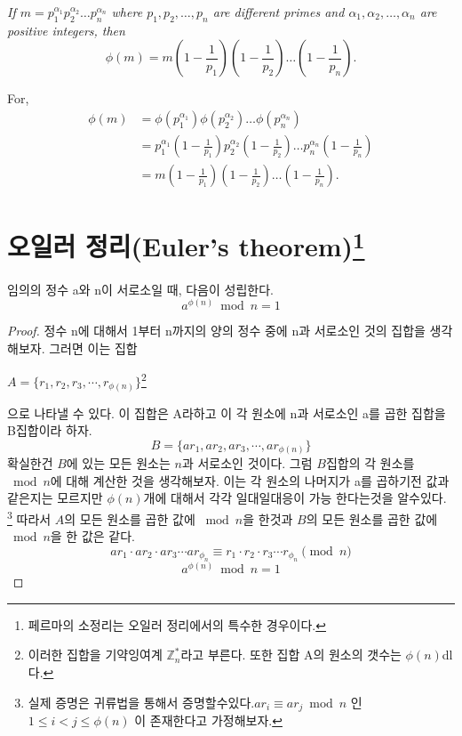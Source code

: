\emph{If $m = p_1^{\alpha_1} p_2^{\alpha_2} \ldots p_n^{\alpha_n}$
where $p_1, p_2, \ldots, p_n$ are different primes and $\alpha_1,
\alpha_2, \ldots, \alpha_n$ are positive integers, then}
\begin{equation*}
\phi(m) = m \left ( 1-\frac{1}{p_1} \right )
            \left ( 1-\frac{1}{p_2} \right )
            \ldots
            \left ( 1-\frac{1}{p_n} \right ).
\end{equation*}

For,
\begin{align*}
\phi(m) &= \phi(p_1^{\alpha_1}) \phi(p_2^{\alpha_2}) \ldots
             \phi(p_n^{\alpha_n}) \\
        &= p_1^{\alpha_1} \left ( 1-\frac{1}{p_1} \right )
             p_2^{\alpha_2} \left ( 1-\frac{1}{p_2} \right )
             \ldots
             p_n^{\alpha_n} \left ( 1-\frac{1}{p_n} \right ) \\
        &= m \left ( 1-\frac{1}{p_1} \right )
             \left ( 1-\frac{1}{p_2} \right )
             \ldots
             \left ( 1-\frac{1}{p_n} \right ).
\end{align*}



\section{오일러 정리(Euler's theorem)\protect\footnote{페르마의 소정리는 오일러 정리에서의 특수한 경우이다.}}

\begin{justbox}
    \begin{theorem}
        임의의 정수 a와 n이 서로소일 때, 다음이 성립한다.
        \[a^{\phi(n)} \bmod n = 1\]
    \end{theorem}
\end{justbox}

\begin{proof}
    
정수 n에 대해서 1부터 n까지의 양의 정수 중에 n과 서로소인 것의 집합을 생각해보자.
그러면 이는 집합
\begin{center}
    $A = \{ r_1 ,r_2,r_3, \cdots ,r_{\phi(n)}\}$\footnote{이러한 집합을 기약잉여계 $\mathbb Z_n^*$라고 부른다. 또한 집합 A의 원소의 갯수는 $\phi(n)$dl다.}
\end{center}
으로 나타낼 수 있다. 이 집합은 A라하고 이 각 원소에 n과 서로소인 a를 곱한 집합을 B집합이라 하자.
\[B = \{ ar_1 ,ar_2,ar_3, \cdots ,ar_{\phi(n)}\} \]
확실한건 $B$에 있는 모든 원소는 $n$과 서로소인 것이다. 
그럼 $B$집합의 각 원소를 $\bmod n$에 대해 계산한 것을 생각해보자.
 이는 각 원소의 나머지가 a를 곱하기전 값과 같은지는 모르지만 $\phi(n)$개에 대해서 각각 일대일대응이 가능 한다는것을 알수있다.
  \footnote{실제 증명은 귀류법을 통해서 증명할수있다.$ar_i  \equiv ar_j \bmod n $ 인 $1 \le i < j \le \phi(n)$ 이 존재한다고 가정해보자.}
따라서 $A$의 모든 원소를 곱한 값에 $\bmod n$을 한것과 $B$의 모든 원소를 곱한 값에 $\bmod n$을 한 값은 같다.
\[ar_1 \cdot ar_2 \cdot ar_3 \cdots ar_{\phi_{n}} \equiv r_1 \cdot r_2 \cdot r_3 \cdots r_{\phi_{n}} \pmod n\]
\[a^{\phi(n)}\bmod n= 1\]
\end{proof}



